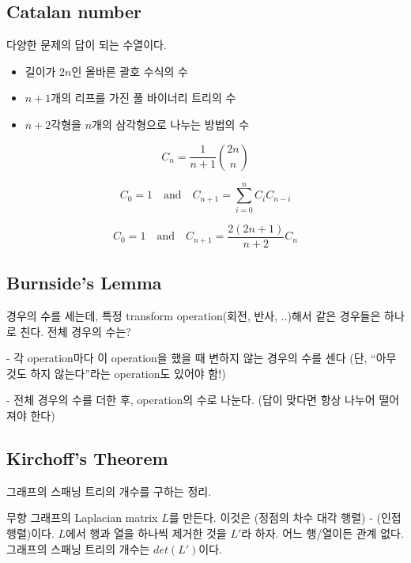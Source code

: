 \documentclass[10pt,landscape,a4paper,twocolumn]{article}
\begin{document}
\subsection{Catalan number}

다양한 문제의 답이 되는 수열이다.

\begin{itemize}
\item 길이가 $2n$인 올바른 괄호 수식의 수
\item $n+1$개의 리프를 가진 풀 바이너리 트리의 수
\item $n+2$각형을 $n$개의 삼각형으로 나누는 방법의 수
\end{itemize}

\begin{displaymath}
C_n = \frac{1}{n + 1} \binom{2n}{n}
\end{displaymath}

\begin{displaymath}
C_0 = 1 \quad  \textrm{and} \quad  C_{n + 1} = \sum_{i=0}^{n} C_i C_{n-i}
\end{displaymath}

\begin{displaymath}
C_0 = 1 \quad \textrm{and} \quad  C_{n + 1} = \frac{2(2n+1)}{n+2} C_n
\end{displaymath}

\subsection{Burnside's Lemma}

경우의 수를 세는데, 특정 transform operation(회전, 반사, ..)해서 같은 경우들은 하나로 친다.
전체 경우의 수는?

- 각 operation마다 이 operation을 했을 때 변하지 않는 경우의 수를 센다
(단, ``아무것도 하지 않는다''라는 operation도 있어야 함!)

- 전체 경우의 수를 더한 후, operation의 수로 나눈다. (답이 맞다면 항상 나누어 떨어져야 한다)

\subsection{Kirchoff's Theorem}

그래프의 스패닝 트리의 개수를 구하는 정리.

무향 그래프의 Laplacian matrix $L$를 만든다. 이것은 (정점의 차수 대각 행렬) - (인접행렬)이다.
$L$에서 행과 열을 하나씩 제거한 것을 $L'$라 하자. 어느 행/열이든 관계 없다.
그래프의 스패닝 트리의 개수는 $det(L')$이다.
\end{document}
